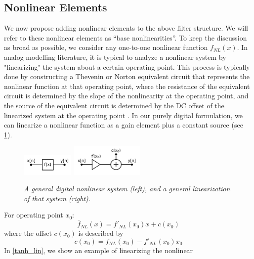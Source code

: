 \documentclass[twoside,a4paper]{article}
\begin{document}
\subsection{Nonlinear Elements}
%
We now propose adding nonlinear elements to the above filter structure.
We will refer to these nonlinear elements as ``base nonlinearities''.
To keep the discussion as broad as possible, we consider any one-to-one
nonlinear function $f_{NL}(x)$.
\newline\newline
In analog modelling literature, it is typical to analyze a nonlinear
system by "linearizing" the system about a certain operating
point. This process is typically done by constructing a Thevenin or
Norton equivalent circuit that represents the nonlinear function at
that operating point, where the resistance of the equivalent circuit
is determined by the slope of the nonlinearity at the operating point,
and the source of the equivalent circuit is determined by the DC
offset of the linearized system at the operating point
\cite{Germain,BernersDAFX}.
\newline\newline
In our purely digital formulation, we can linearize a nonlinear function
as a gain element plus a constant source (see \cref{linize}).
%
\begin{figure}[!ht]
    \center
    \includegraphics[width=1.0in]{../Pics/NL_sys_trim_white.png}
    \includegraphics[width=1.4in]{../Pics/NL_sys_lin_white.png}
    \caption{\label{linize}{\it A general digital nonlinear system (left),
                                and a general linearization of that system (right).}}
\end{figure}
%
For operating point $x_0$:
%
\begin{equation}
    \bar{f}_{NL}(x) = f'_{NL}(x_0)x + c(x_0)
    \label{eq:linearized}
\end{equation}
%
where the offset $c(x_0)$ is described by
%
\begin{equation}
    c(x_0) = f_{NL}(x_0) - f'_{NL}(x_0)x_0
    \label{eq:lin_off}
\end{equation}
%
In \cref{tanh_lin}, we show an example of linearizing the nonlinear
\end{document}
